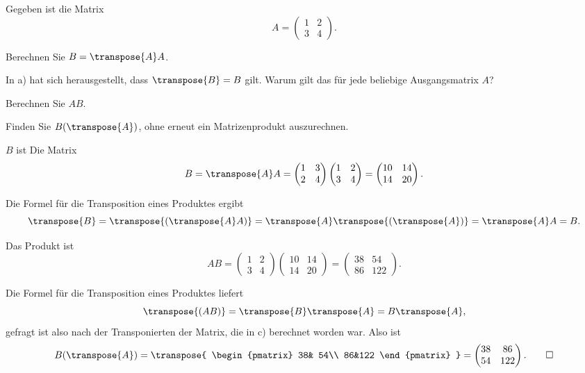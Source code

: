 Gegeben ist die Matrix
\[
A
=
\begin{pmatrix}1&2\\3&4\end{pmatrix}.
\]
\begin{teilaufgaben}
\item Berechnen Sie $B=\transpose{A}A$.
\item In a) hat sich herausgestellt, dass $\transpose{B}=B$ gilt.
Warum gilt das für jede beliebige Ausgangsmatrix $A$?
\item
Berechnen Sie $AB$.
\item
Finden Sie $B(\transpose{A})$, ohne erneut ein Matrizenprodukt auszurechnen.
\end{teilaufgaben}


\begin{loesung}
\begin{teilaufgaben}
\item $B$ ist Die Matrix
\[
B=\transpose{A}A=
\begin{pmatrix}1&3\\2&4\end{pmatrix}
\begin{pmatrix}1&2\\3&4\end{pmatrix}
=
\begin{pmatrix}
10&14\\
14&20
\end{pmatrix}.
\]
\item Die Formel für die Transposition eines Produktes ergibt
\[
\transpose{B}
=
\transpose{(\transpose{A}A)}
=
\transpose{A}\transpose{(\transpose{A})}
=
\transpose{A}A
=
B.
\]
\item
Das Produkt ist
\[
AB
=
\begin{pmatrix}1&2\\3&4\end{pmatrix}
\begin{pmatrix}
10&14\\
14&20
\end{pmatrix}
=
\begin{pmatrix}
38& 54\\
86&122
\end{pmatrix}.
\]
\item
Die Formel für die Transposition eines Produktes liefert
\[
\transpose{(AB)} = \transpose{B}\transpose{A}=B\transpose{A},
\]
gefragt ist also nach der Transponierten der Matrix, die in c) berechnet
worden war.
Also ist
\[
B(\transpose{A})
= 
\transpose{
\begin{pmatrix}
38& 54\\
86&122
\end{pmatrix}
}
=
\begin{pmatrix}
38& 86\\
54&122
\end{pmatrix}.
\qedhere
\]
\end{teilaufgaben}
\end{loesung}


